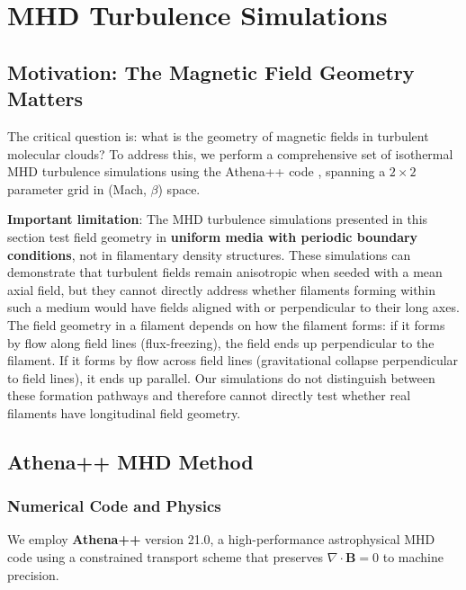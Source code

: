 \documentclass[11pt,a4paper]{article}
\begin{document}
\section{MHD Turbulence Simulations}
\label{sec:mhd}

\subsection{Motivation: The Magnetic Field Geometry Matters}

The critical question is: what is the geometry of magnetic fields in turbulent molecular clouds? To address this, we perform a comprehensive set of isothermal MHD turbulence simulations using the Athena++ code \citep{Stone2020}, spanning a $2\times2$ parameter grid in (Mach, $\beta$) space.

\textbf{Important limitation}: The MHD turbulence simulations presented in this section test field geometry in \textbf{uniform media with periodic boundary conditions}, not in filamentary density structures. These simulations can demonstrate that turbulent fields remain anisotropic when seeded with a mean axial field, but they cannot directly address whether filaments forming within such a medium would have fields aligned with or perpendicular to their long axes. The field geometry in a filament depends on how the filament forms: if it forms by flow along field lines (flux-freezing), the field ends up perpendicular to the filament. If it forms by flow across field lines (gravitational collapse perpendicular to field lines), it ends up parallel. Our simulations do not distinguish between these formation pathways and therefore cannot directly test whether real filaments have longitudinal field geometry.

\subsection{Athena++ MHD Method}

\subsubsection{Numerical Code and Physics}

We employ \textbf{Athena++} version 21.0, a high-performance astrophysical MHD code using a constrained transport scheme that preserves $\nabla \cdot \mathbf{B} = 0$ to machine precision.
\end{document}
